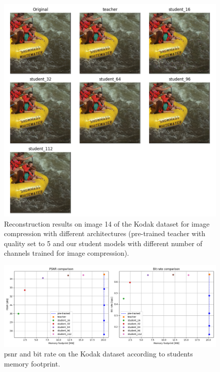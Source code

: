 \begin{figure}
    \centering
    \includegraphics[width=15cm]{../img/kd_lic_kodak_14.png}
    \caption[Reconstruction results on image 14 of the Kodak dataset for image compression with different architectures.]{Reconstruction results on image 14 of the Kodak dataset for image compression with different architectures (pre-trained teacher with \textsf{quality} set to 5 and our student models with different number of channels trained for image compression).}
    \label{appendix:kd_lic_2:a}
\end{figure}

\begin{figure}
    \centering
    \includegraphics[width=15cm]{../img/kd_lic_memory.png}
    \caption[\acrshort{psnr} and bit rate on the Kodak dataset according to students memory footprint.]{\acrshort{psnr} and bit rate on the Kodak dataset according to students memory footprint.}
    \label{appendix:kd_lic_memory}
\end{figure}

